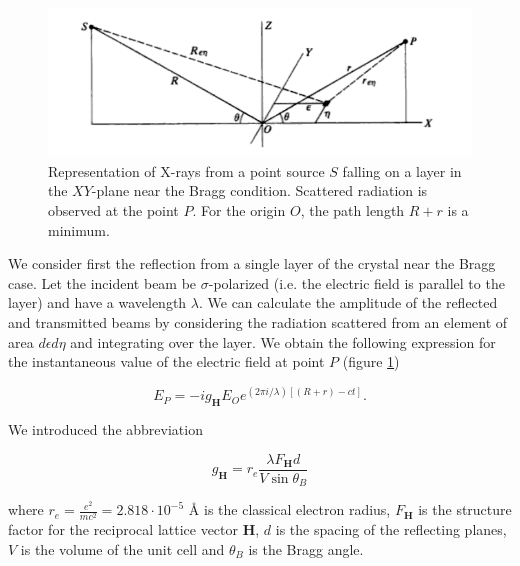 \documentclass[12pt,oneside,notitlepage,abstracton,a4paper]{scrartcl}
\begin{document}
\begin{figure}[h]
\begin{center}
\includegraphics[width=12cm]{pics/picture1.png}
\vspace{-10pt}
\caption{Representation of X-rays from a point source $S$ falling on a layer in the $XY$-plane near the Bragg condition. Scattered radiation is observed at the point $P$. For the origin $O$, the path length $R+r$ is a minimum.}
\label{pic1}
\vspace{-10pt}
\end{center}
\end{figure}

We consider first the reflection from a single layer of the crystal near the Bragg case. Let the incident beam be $\sigma$-polarized (i.e. the electric field is parallel to the layer) and have a wavelength $\lambda$. We can calculate the amplitude of the reflected and transmitted beams by considering the radiation scattered from an element of area $d\epsilon d\eta$ and integrating over the layer. We obtain the following expression for the instantaneous value of the electric field at point $P$ (figure \ref{pic1})

\begin{equation}
 E_P=-ig_\mathbf{H}E_Oe^{(2\pi i /\lambda)[(R+r)-ct]}.
\end{equation}

We introduced the abbreviation

\begin{equation}\label{eqg}
 g_\mathbf{H}=r_e\frac{\lambda F_\mathbf{H}d}{V \sin{\theta_B}}
\end{equation}

where $r_e=\frac{e^2}{mc^2}=2.818 \cdot 10^{-5}$ \AA{} is the classical electron radius, $F_\mathbf{H}$ is the structure factor for the reciprocal lattice vector $\mathbf{H}$, $d$ is the spacing of the reflecting planes, $V$ is the volume of the unit cell and $\theta_B$ is the Bragg angle.
\end{document}
